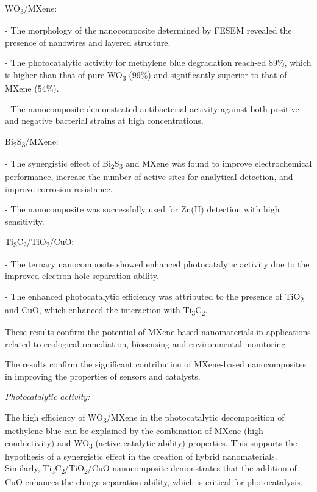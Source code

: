 \begin{multicols}{2}
WO\textsubscript{3}/MXene:

- The morphology of the nanocomposite determined by FESEM revealed
the presence of nanowires and layered structure.

- The photocatalytic activity for methylene blue degradation
reach-ed 89\%, which is higher than that of pure
WO\textsubscript{3} (99\%) and significantly superior to that of
MXene (54\%).

- The nanocomposite demonstrated antibacterial activity against
both positive and negative bacterial strains at high
concentrations.

Bi\textsubscript{2}S\textsubscript{3}/MXene:

- The synergistic effect of Bi\textsubscript{2}S\textsubscript{3}
and MXene was found to improve electrochemical performance,
increase the number of active sites for analytical detection,
and improve corrosion resistance.

- The nanocomposite was successfully used for Zn(II) detection
with high sensitivity.

Ti\textsubscript{3}C\textsubscript{2}/TiO\textsubscript{2}/CuO:

- The ternary nanocomposite showed enhanced photocatalytic
activity due to the improved electron-hole separation ability.

- The enhanced photocatalytic efficiency was attributed to the
presence of TiO\textsubscript{2} and CuO, which enhanced the
interaction with Ti\textsubscript{3}C\textsubscript{2}.

These results confirm the potential of MXene-based nanomaterials
in applications related to ecological remediation, biosensing and
environmental monitoring.

The results confirm the significant contribution of MXene-based
nanocomposites in improving the properties of sensors and
catalysts.

\emph{Photocatalytic activity:}

The high efficiency of WO\textsubscript{3}/MXene in the
photocatalytic decomposition of methylene blue can be explained by
the combination of MXene (high conductivity) and
WO\textsubscript{3} (active catalytic ability) properties. This
supports the hypothesis of a synergistic effect in the creation
of hybrid nanomaterials. Similarly,
Ti\textsubscript{3}C\textsubscript{2}/TiO\textsubscript{2}/CuO
nanocomposite demonstrates that the addition of CuO enhances the
charge separation ability, which is critical for photocatalysis.


\end{multicols}
